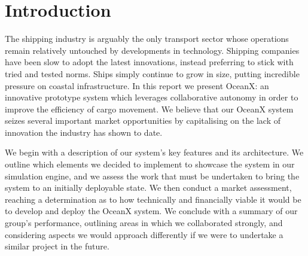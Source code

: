 \section{Introduction}

The shipping industry is arguably the only transport sector whose operations remain relatively untouched by developments in technology. Shipping companies have been slow to adopt the latest innovations, instead preferring to stick with tried and tested norms. Ships simply continue to grow in size, putting incredible pressure on coastal infrastructure. In this report we present OceanX: an innovative prototype system which leverages collaborative autonomy in order to improve the efficiency of cargo movement. We believe that our OceanX system seizes several important market opportunities by capitalising on the lack of innovation the industry has shown to date.

We begin with a description of our system’s key features and its architecture. We outline which elements we decided to implement to showcase the system in our simulation engine, and we assess the work that must be undertaken to bring the system to an initially deployable state. We then conduct a market assessment, reaching a determination as to how technically and financially viable it would be to develop and deploy the OceanX system. We conclude with a summary of our group’s performance, outlining areas in which we collaborated strongly, and considering aspects we would approach differently if we were to undertake a similar project in the future.

